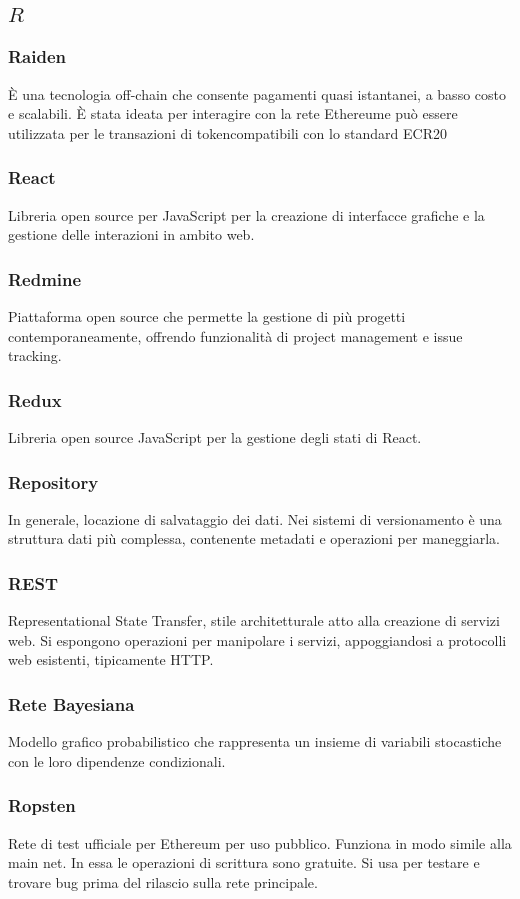 \subsection*{\quad$R\quad$}
\subsubsection*{Raiden}
È una tecnologia off-chain che consente pagamenti quasi istantanei, a basso costo e scalabili. È stata ideata per interagire con la rete Ethereum\glosp e può essere utilizzata per le transazioni di token\glosp compatibili con lo standard ECR20\glo

\subsubsection*{React}
Libreria open source per JavaScript per la creazione di interfacce grafiche e la gestione delle interazioni in ambito web.

\subsubsection*{Redmine}
Piattaforma open source che permette la gestione di più progetti contemporaneamente, offrendo funzionalità di project management e issue tracking.

\subsubsection*{Redux}
Libreria open source JavaScript per la gestione degli stati di React.

\subsubsection*{Repository}
In generale, locazione di salvataggio dei dati. Nei sistemi di versionamento è una struttura dati più complessa, contenente metadati e operazioni per maneggiarla.

\subsubsection*{REST}
Representational State Transfer, stile architetturale atto alla creazione di servizi web. Si espongono operazioni per manipolare i servizi, appoggiandosi a protocolli web esistenti, tipicamente HTTP.

\subsubsection*{Rete Bayesiana}
Modello grafico probabilistico che rappresenta un insieme di variabili stocastiche con le loro dipendenze condizionali.

\subsubsection*{Ropsten}
Rete di test ufficiale per Ethereum per uso pubblico. Funziona in modo simile alla main net. In essa le operazioni di scrittura sono gratuite. Si usa per testare e trovare bug prima del rilascio sulla rete principale.

